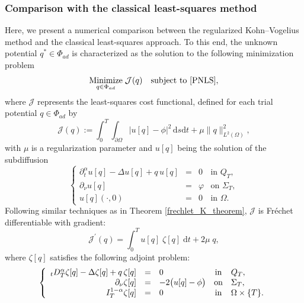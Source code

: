 \documentclass[a4paper,12pt,reqno,natbib]{amsart}
\newcommand{\dt} {\displaystyle\mathrm{d}t}
\newcommand{\dss} {\displaystyle\mathrm{d}s}
\begin{document}
{\subsubsection{\bf Comparison with the classical least-squares method}
Here, we present a numerical comparison between the regularized Kohn--Vogelius method and the classical least-squares approach. 
To this end, the unknown potential $q^* \in \Phi_{ad}$ is characterized as the solution to the following minimization problem
\begin{equation*}%
\underset{q\in \Phi_{ad}}{\operatorname{Minimize}}\; \mathcal{J}(q) \quad \text{subject to } \eqref{PNLS},
\end{equation*}
where $\mathcal{J}$ represents the least-squares cost functional, defined for each trial potential $q \in \Phi_{ad}$ by
\begin{equation*}%
\mathcal{J}(q) := \int_0^T \int_{\partial\Omega} \big|u[q]-\phi\big|^2 \,\dss\dt+\mu\|q\|_{L^2(\Omega)}^2,
\end{equation*}
with $\mu$ is a regularization parameter and $u[q]$ being the solution of the subdiffusion
\begin{equation} \label{PNLS}
\left\{
  \begin{array}{rcll}
    \partial_{t}^{\alpha} u[q] - \Delta u[q] + q\, u[q] &=& 0 & \text{in } Q_T, \\[0.3em]
    \partial_\nu u[q] &=& \varphi & \text{on } \Sigma_T, \\[0.3em]
    u[q](\cdot,0) &=& 0 & \text{in } \Omega.
  \end{array}
\right.
\end{equation}
Following similar techniques as in Theorem \ref{frechlet_K_theorem}, $\mathcal{J}$ is Fréchet differentiable with gradient:
\begin{equation*}
    \mathcal{J}^\prime(q)=\int_0^T u[q]\;\zeta[q]\;\dt +2\mu \;q,
\end{equation*}
where $\zeta[q]$ satisfies the following adjoint problem:
\begin{eqnarray*} %
 \left\{
   \begin{array}{rclcl}
      {}_tD^{\alpha}_T \zeta[q]-\Delta  \zeta[q] +q\, \zeta[q] &=&0& \hbox{in} & Q_T, \\
 \partial_\nu\zeta[q]&=&-2\big(u[q] -\phi\big) &\hbox{on} & \Sigma_T,\\
 I^{1-\alpha}_{T}\zeta[q]&=&0 &\hbox{in} & \Omega\times\{T\}.
   \end{array}
 \right.
 \end{eqnarray*}


}
\end{document}
